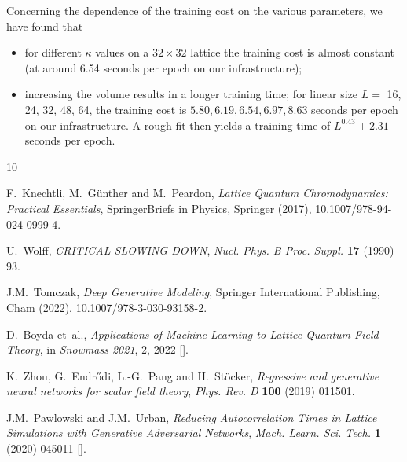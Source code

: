 {Concerning the dependence of the training cost on the various parameters, we have found that 
\begin{itemize}
\item for different $\kappa$ values on a $32\times 32$ lattice the training cost is almost constant (at around 6.54 seconds per epoch on our infrastructure);
\item increasing the volume results in a longer training time; for linear size \(L =\) 16, 24, 32, 48, 64, the training cost is \(5.80, 6.19, 6.54, 6.97, 8.63\) seconds per epoch on our infrastructure. A rough fit then yields a training time of $L^{0.43} + 2.31$ seconds per epoch.
\end{itemize}
}

\providecommand{\href}[2]{#2}\begingroup\raggedright\begin{thebibliography}{10}

F.~Knechtli, M.~G\"unther and M.~Peardon, \emph{{Lattice Quantum
  Chromodynamics: Practical Essentials}}, SpringerBriefs in Physics, Springer
  (2017),
  \href{https://doi.org/10.1007/978-94-024-0999-4}{10.1007/978-94-024-0999-4}.

U.~Wolff, \emph{{CRITICAL SLOWING DOWN}},
  \href{https://doi.org/10.1016/0920-5632(90)90224-I}{\emph{Nucl. Phys. B Proc.
  Suppl.} {\bfseries 17} (1990) 93}.

J.M.~Tomczak, \emph{Deep Generative Modeling}, {Springer International
  Publishing}, {Cham} (2022),
  \href{https://doi.org/10.1007/978-3-030-93158-2}{10.1007/978-3-030-93158-2}.

D.~Boyda et~al., \emph{{Applications of Machine Learning to Lattice Quantum
  Field Theory}},  in \emph{{Snowmass 2021}}, 2, 2022
  [\href{https://arxiv.org/abs/2202.05838}{{}}].

K.~Zhou, G.~Endr{\H o}di, L.-G.~Pang and H.~St{\"o}cker, \emph{Regressive and
  generative neural networks for scalar field theory},
  \href{https://doi.org/10.1103/PhysRevD.100.011501}{\emph{Phys. Rev. D}
  {\bfseries 100} (2019) 011501}.

J.M.~Pawlowski and J.M.~Urban, \emph{{Reducing Autocorrelation Times in Lattice
  Simulations with Generative Adversarial Networks}},
  \href{https://doi.org/10.1088/2632-2153/abae73}{\emph{Mach. Learn. Sci.
  Tech.} {\bfseries 1} (2020) 045011}
  [\href{https://arxiv.org/abs/1811.03533}{{}}].


\end{thebibliography}
